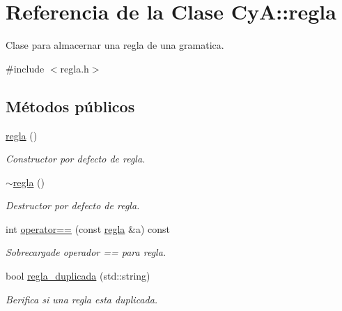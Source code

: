 \hypertarget{class_cy_a_1_1regla}{}\section{Referencia de la Clase CyA\+:\+:regla}
\label{class_cy_a_1_1regla}


Clase para almacernar una regla de una gramatica.  




{\ttfamily \#include $<$regla.\+h$>$}

\subsection*{Métodos públicos}
\begin{DoxyCompactItemize}
\item 
\mbox{\label{class_cy_a_1_1regla_aa5bc78631a7e4690fa64b393276876fb}} 
\mbox{\hyperlink{class_cy_a_1_1regla_aa5bc78631a7e4690fa64b393276876fb}{regla}} ()
\begin{DoxyCompactList}\small\item\em Constructor por defecto de regla. \end{DoxyCompactList}\item 
\mbox{\label{class_cy_a_1_1regla_a67058ee1235792dc7b59dce849888349}} 
\mbox{\hyperlink{class_cy_a_1_1regla_a67058ee1235792dc7b59dce849888349}{$\sim$regla}} ()
\begin{DoxyCompactList}\small\item\em Destructor por defecto de regla. \end{DoxyCompactList}\item 
int \mbox{\hyperlink{class_cy_a_1_1regla_a0959c90f17fdc569bec1faeb9af04d41}{operator==}} (const \mbox{\hyperlink{class_cy_a_1_1regla}{regla}} \&a) const
\begin{DoxyCompactList}\small\item\em Sobrecargade operador == para regla. \end{DoxyCompactList}\item 
bool \mbox{\hyperlink{class_cy_a_1_1regla_a9084203e31007ef2a0803b26da371e04}{regla\+\_\+duplicada}} (std\+::string)
\begin{DoxyCompactList}\small\item\em Berifica si una regla esta duplicada. \end{DoxyCompactList}\end{DoxyCompactItemize}
